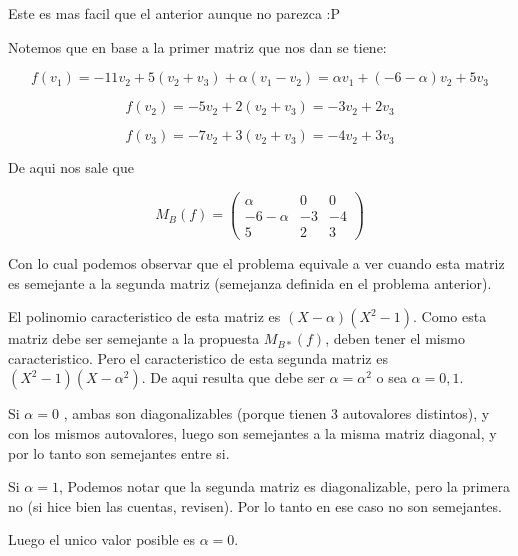 \documentclass{article}
\begin{document}
Este es mas facil que el anterior aunque no parezca :P

Notemos que en base a la primer matriz que nos dan se tiene:

$$f(v_1) = -11v_2 + 5(v_2 + v_3) + \alpha(v_1-v_2) = \alpha v_1 + (-6 -\alpha) v_2 + 5v_3$$

$$f(v_2) = -5v_2 + 2(v_2 + v_3) = -3v_2 + 2v_3$$

$$f(v_3) = -7v_2 + 3(v_2 + v_3) = -4v_2 + 3v_3$$

De aqui nos sale que

$$M_{B}(f) = \begin{pmatrix} \alpha & 0 & 0 \\ -6-\alpha & -3 & -4 \\ 5 & 2 & 3 \end{pmatrix}$$

Con lo cual podemos observar que el problema equivale a ver cuando esta matriz es semejante a la segunda matriz (semejanza definida
en el problema anterior).

El polinomio caracteristico de esta matriz es $(X-\alpha)(X^2-1)$. Como esta matriz debe ser semejante a la propuesta
$M_{B*}(f)$, deben tener el mismo caracteristico. Pero el caracteristico de esta segunda matriz es
$(X^2-1)(X-\alpha^2)$. De aqui resulta que debe ser $\alpha = \alpha^2$ o sea $\alpha = 0,1$.

Si $\alpha = 0$ , ambas son diagonalizables (porque tienen 3 autovalores distintos), y con los mismos autovalores, luego son semejantes
a la misma matriz diagonal, y por lo tanto son semejantes entre si.


Si $\alpha = 1$, Podemos notar que la segunda matriz es diagonalizable, pero la primera no (si hice bien las cuentas, revisen). 
Por lo tanto en ese caso no son semejantes.

Luego el unico valor posible es $\alpha = 0$.
\end{document}
